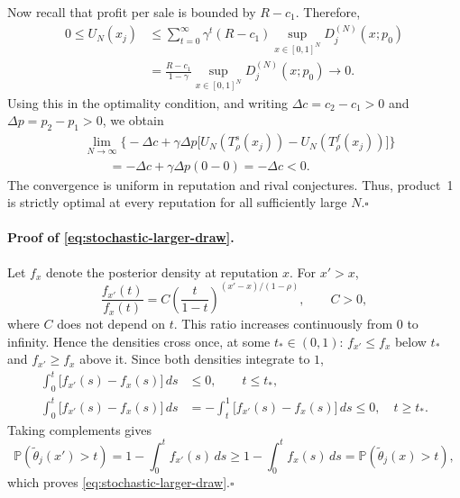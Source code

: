 \documentclass[11pt]{article}
\newcommand{\Pb}{\mathbb P}
\begin{document}
Now recall that profit per sale is bounded by $R-c_1$. Therefore,
\begin{equation}
\begin{aligned}
0\leq U_N(x_j)
&\leq\sum_{t=0}^{\infty}\gamma^t(R-c_1)
\sup_{x\in[0,1]^N}D_j^{(N)}(x;p_0)\\
&=\frac{R-c_1}{1-\gamma}
\sup_{x\in[0,1]^N}D_j^{(N)}(x;p_0)
\longrightarrow0.
\end{aligned}
\end{equation}
Using this in the optimality condition, and writing
$\Delta c=c_2-c_1>0$ and $\Delta p=p_2-p_1>0$, we obtain
\begin{equation}
\begin{aligned}
&\lim_{N\to\infty}\Big\{
-\Delta c+\gamma\Delta p
\big[U_N(T_\rho^s(x_j))-U_N(T_\rho^f(x_j))\big]\Big\}\\
&\qquad=-\Delta c+\gamma\Delta p(0-0)
=-\Delta c<0.
\end{aligned}
\end{equation}
The convergence is uniform in reputation and rival conjectures.
Thus, product~1 is strictly optimal at every reputation for all
sufficiently large $N$.\hfill$\square$

\paragraph{Proof of \eqref{eq:stochastic-larger-draw}.}
Let $f_x$ denote the posterior density at reputation $x$. For $x'>x$,
\begin{equation}
\frac{f_{x'}(t)}{f_x(t)}
=C\left(\frac{t}{1-t}\right)^{(x'-x)/(1-\rho)},
\qquad C>0,
\end{equation}
where $C$ does not depend on $t$. This ratio increases continuously
from $0$ to infinity. Hence the densities cross once, at some
$t_*\in(0,1)$: $f_{x'}\leq f_x$ below $t_*$ and $f_{x'}\geq f_x$ above it.
Since both densities integrate to $1$,
\begin{equation}
\begin{aligned}
\int_0^t\big[f_{x'}(s)-f_x(s)\big]\,ds
&\leq0,\qquad t\leq t_*,\\
\int_0^t\big[f_{x'}(s)-f_x(s)\big]\,ds
&=-\int_t^1\big[f_{x'}(s)-f_x(s)\big]\,ds\leq0,
\quad t\geq t_*.
\end{aligned}
\end{equation}
Taking complements gives
\begin{equation}
\Pb(\widetilde\theta_j(x')>t)
=1-\int_0^t f_{x'}(s)\,ds
\geq1-\int_0^t f_x(s)\,ds
=\Pb(\widetilde\theta_j(x)>t),
\end{equation}
which proves \eqref{eq:stochastic-larger-draw}.\hfill$\square$
\end{document}
